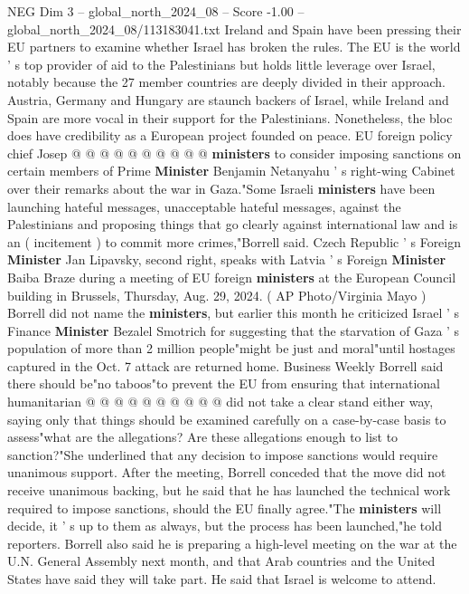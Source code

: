 \begin{textsample}{NEG Dim 3 – global\_north\_2024\_08 – Score -1.00 – global\_north\_2024\_08/113183041.txt}
Ireland and Spain have been pressing their EU partners to examine whether Israel has broken the rules.
The EU is the world ' s top provider of aid to the Palestinians but holds little leverage over Israel, notably because the 27 member countries are deeply divided in their approach.
Austria, Germany and Hungary are staunch backers of Israel, while Ireland and Spain are more vocal in their support for the Palestinians.
Nonetheless, the bloc does have credibility as a European project founded on peace.
EU foreign policy chief Josep @ @ @ @ @ @ @ @ @ @ \textbf{ministers} to consider imposing sanctions on certain members of Prime \textbf{Minister} Benjamin Netanyahu ' s right-wing Cabinet over their remarks about the war in Gaza."Some Israeli \textbf{ministers} have been launching hateful messages, unacceptable hateful messages, against the Palestinians and proposing things that go clearly against international law and is an ( incitement ) to commit more crimes,"Borrell said.
Czech Republic ' s Foreign \textbf{Minister} Jan Lipavsky, second right, speaks with Latvia ' s Foreign \textbf{Minister} Baiba Braze during a meeting of EU foreign \textbf{ministers} at the European Council building in Brussels, Thursday, Aug. 29, 2024. ( AP Photo/Virginia Mayo ) Borrell did not name the \textbf{ministers}, but earlier this month he criticized Israel ' s Finance \textbf{Minister} Bezalel Smotrich for suggesting that the starvation of Gaza ' s population of more than 2 million people"might be just and moral"until hostages captured in the Oct. 7 attack are returned home.
Business Weekly Borrell said there should be"no taboos"to prevent the EU from ensuring that international humanitarian @ @ @ @ @ @ @ @ @ @ did not take a clear stand either way, saying only that things should be examined carefully on a case-by-case basis to assess"what are the allegations?
Are these allegations enough to list to sanction?"She underlined that any decision to impose sanctions would require unanimous support.
After the meeting, Borrell conceded that the move did not receive unanimous backing, but he said that he has launched the technical work required to impose sanctions, should the EU finally agree."The \textbf{ministers} will decide, it ' s up to them as always, but the process has been launched,"he told reporters.
Borrell also said he is preparing a high-level meeting on the war at the U.N.
General Assembly next month, and that Arab countries and the United States have said they will take part.
He said that Israel is welcome to attend.

\end{textsample}
